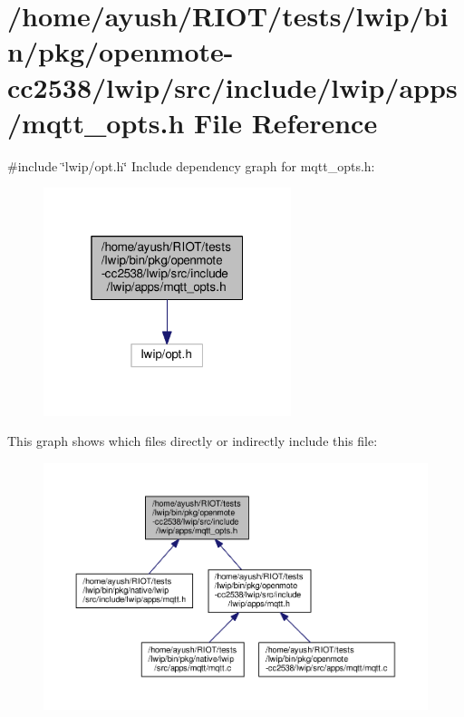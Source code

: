\hypertarget{openmote-cc2538_2lwip_2src_2include_2lwip_2apps_2mqtt__opts_8h}{}\section{/home/ayush/\+R\+I\+O\+T/tests/lwip/bin/pkg/openmote-\/cc2538/lwip/src/include/lwip/apps/mqtt\+\_\+opts.h File Reference}
\label{openmote-cc2538_2lwip_2src_2include_2lwip_2apps_2mqtt__opts_8h}
{\ttfamily \#include \char`\"{}lwip/opt.\+h\char`\"{}}\newline
Include dependency graph for mqtt\+\_\+opts.\+h\+:
\nopagebreak
\begin{figure}[H]
\begin{center}
\leavevmode
\includegraphics[width=205pt]{openmote-cc2538_2lwip_2src_2include_2lwip_2apps_2mqtt__opts_8h__incl}
\end{center}
\end{figure}
This graph shows which files directly or indirectly include this file\+:
\nopagebreak
\begin{figure}[H]
\begin{center}
\leavevmode
\includegraphics[width=350pt]{openmote-cc2538_2lwip_2src_2include_2lwip_2apps_2mqtt__opts_8h__dep__incl}
\end{center}
\end{figure}

